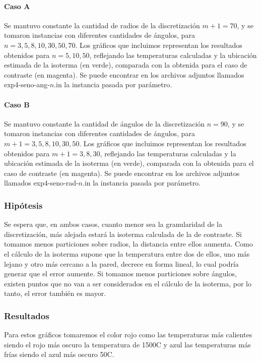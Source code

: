         \paragraph{Caso A} Se mantuvo constante la cantidad de radios de la discretización $m + 1 = 70$, y se tomaron instancias con diferentes cantidades de ángulos, para $n = 3, 5, 8, 10, 30, 50, 70$. Los gráficos que incluimos representan los resultados obtenidos para $n = 5, 10, 50$, reflejando las temperaturas calculadas y la ubicación estimada de la isoterma (en verde), comparada con la obtenida para el caso de contraste (en magenta). Se puede encontrar en los archivos adjuntos llamados exp4-seno-ang-$n$.in la instancia pasada por parámetro.
        
        \paragraph{Caso B} Se mantuvo constante la cantidad de ángulos de la discretización $n = 90$, y se tomaron instancias con diferentes cantidades de ángulos, para $m + 1 = 3, 5, 8, 10, 30, 50$. Los gráficos que incluimos representan los resultados obtenidos para $m + 1 = 3, 8, 30$, reflejando las temperaturas calculadas y la ubicación estimada de la isoterma (en verde), comparada con la obtenida para el caso de contraste (en magenta). Se puede encontrar en los archivos adjuntos llamados exp4-seno-rad-$n$.in la instancia pasada por parámetro.
     
      \subsubsection*{Hipótesis}
          Se espera que, en ambos casos, cuanto menor sea la granularidad de la discretización, más alejada estará la isoterma calculada de la de contraste. Si tomamos menos particiones sobre radios, la distancia entre ellos aumenta. Como el cálculo de la isoterma supone que la temperatura entre dos de ellos, uno más lejano y otro más cercano a la pared, decrece en forma lineal, lo cual podría generar que el error aumente. Si tomamos menos particiones sobre ángulos, existen puntos que no van a ser considerados en el cálculo de la isoterma, por lo tanto, el error también es mayor. 


      \subsubsection*{Resultados}

        Para estos gráficos tomaremos el color rojo como las temperaturas más calientes siendo el rojo más oscuro la temperatura de 1500{\degree}C y azul las temperaturas más frías siendo el azul más oscuro 50{\degree}C.
        
